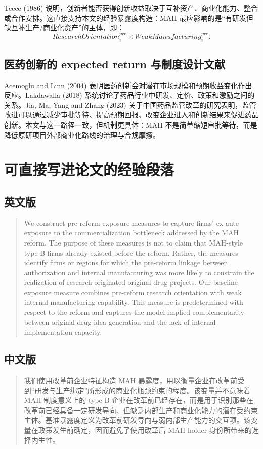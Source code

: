 \documentclass[12pt]{ctexart}
\begin{document}
Teece (1986) 说明，创新者能否获得创新收益取决于互补资产、商业化能力、整合或合作安排。这直接支持本文的经验暴露度构造：MAH 最应影响的是“有研发但缺互补生产/商业化资产”的主体，即：
\[
ResearchOrientation_i^{pre}\times WeakManufacturing_i^{pre}.
\]

\subsection{医药创新的 expected return 与制度设计文献}

Acemoglu and Linn (2004) 表明医药创新会对潜在市场规模和预期收益变化作出反应。Lakdawalla (2018) 系统讨论了药品行业中研发、定价、政策和激励之间的关系。Jia, Ma, Yang and Zhang (2023) 关于中国药品监管改革的研究表明，监管改进可以通过减少审批等待、提高预期回报、改变企业进入和创新结果来促进药品创新。本文与这一路径一致，但机制更具体：MAH 不是简单缩短审批等待，而是降低原研项目外部商业化路线的治理与合规摩擦。

\section{可直接写进论文的经验段落}

\subsection*{英文版}

\begin{quote}
We construct pre-reform exposure measures to capture firms' ex ante exposure to the commercialization bottleneck addressed by the MAH reform. The purpose of these measures is not to claim that MAH-style type-B firms already existed before the reform. Rather, the measures identify firms or regions for which the pre-reform linkage between authorization and internal manufacturing was more likely to constrain the realization of research-originated original-drug projects. Our baseline exposure measure combines pre-reform research orientation with weak internal manufacturing capability. This measure is predetermined with respect to the reform and captures the model-implied complementarity between original-drug idea generation and the lack of internal implementation capacity.
\end{quote}

\subsection*{中文版}

\begin{quote}
我们使用改革前企业特征构造 MAH 暴露度，用以衡量企业在改革前受到“研发与生产绑定”所形成的商业化瓶颈约束的程度。该变量并不意味着 MAH 制度意义上的 type-B 企业在改革前已经存在，而是用于识别那些在改革前已经具备一定研发导向、但缺乏内部生产和商业化能力的潜在受约束主体。基准暴露度定义为改革前研发导向与弱内部生产能力的交互项。该变量在政策发生前确定，因而避免了使用改革后 MAH-holder 身份所带来的选择内生性。
\end{quote}
\end{document}
